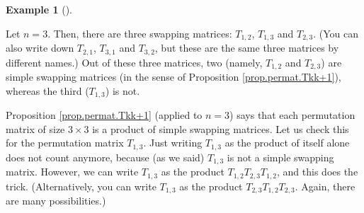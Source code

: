 \documentclass[numbers=enddot,12pt,final,onecolumn,notitlepage]{scrartcl}%
\theoremstyle{definition}
\newtheorem{exam}[theo]{Example}
\newenvironment{example}[1][]
{\begin{exam}[#1]\begin{leftbar}}
{\end{leftbar}\end{exam}}
\begin{document}
\begin{example}
Let $n=3$. Then, there are three swapping matrices: $T_{1,2}$, $T_{1,3}$ and
$T_{2,3}$. (You can also write down $T_{2,1}$, $T_{3,1}$ and $T_{3,2}$, but
these are the same three matrices by different names.) Out of these three
matrices, two (namely, $T_{1,2}$ and $T_{2,3}$) are simple swapping matrices
(in the sense of Proposition \ref{prop.permat.Tkk+1}), whereas the third
($T_{1,3}$) is not.

Proposition \ref{prop.permat.Tkk+1} (applied to $n=3$) says that each
permutation matrix of size $3\times3$ is a product of simple swapping
matrices. Let us check this for the permutation matrix $T_{1,3}$. Just writing
$T_{1,3}$ as the product of itself alone does not count anymore, because (as
we said) $T_{1,3}$ is not a simple swapping matrix. However, we can write
$T_{1,3}$ as the product $T_{1,2}T_{2,3}T_{1,2}$, and this does the trick.
(Alternatively, you can write $T_{1,3}$ as the product $T_{2,3}T_{1,2}T_{2,3}%
$. Again, there are many possibilities.)
\end{example}
\end{document}
